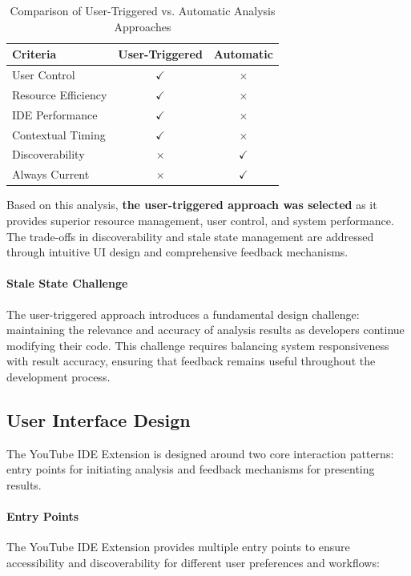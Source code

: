 \begin{spacing}{1.2}
\begin{table}[H]
\centering
\caption{Comparison of User-Triggered vs. Automatic Analysis Approaches}
\label{tab:analysis_approaches}
\begin{tabular}{|l|c|c|}
\hline
\textbf{Criteria} & \textbf{User-Triggered} & \textbf{Automatic} \\
\hline
User Control & $\checkmark$ & $\times$ \\
\hline
Resource Efficiency & $\checkmark$ & $\times$ \\
\hline
IDE Performance & $\checkmark$ & $\times$ \\
\hline
Contextual Timing & $\checkmark$ & $\times$ \\
\hline
Discoverability & $\times$ & $\checkmark$ \\
\hline
Always Current & $\times$ & $\checkmark$ \\
\hline
\end{tabular}
\end{table}

Based on this analysis, \textbf{the user-triggered approach was selected} as it provides superior resource management, user control, and system performance. The trade-offs in discoverability and stale state management are addressed through intuitive UI design and comprehensive feedback mechanisms.

\paragraph{Stale State Challenge}
The user-triggered approach introduces a fundamental design challenge: maintaining the relevance and accuracy of analysis results as developers continue modifying their code. This challenge requires balancing system responsiveness with result accuracy, ensuring that feedback remains useful throughout the development process.

\subsection{User Interface Design}
The YouTube IDE Extension is designed around two core interaction patterns: entry points for initiating analysis and feedback mechanisms for presenting results.

\paragraph{Entry Points}
The YouTube IDE Extension provides multiple entry points to ensure accessibility and discoverability for different user preferences and workflows:


\end{spacing}
